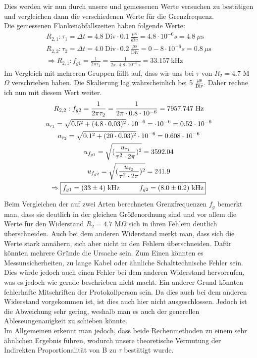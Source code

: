 Dies werden wir nun durch unsere und gemessenen Werte versuchen zu bestätigen und vergleichen dann die verschiedenen Werte für die Grenzfrequenz. \\
Die gemessenen Flankenabfallszeiten haben folgende Werte:
\begin{gather}
    R_{2,1}:\tau_1=\Delta t =4.8~\text{Div} \cdot 0.1~\frac{\mu\text{s}}{div}=4.8\cdot10^{-6}s=4.8~\mu\text{s}\\
    R_{2,2}:\tau_2=\Delta t =4.0~\text{Div} \cdot 0.2~\frac{\mu\text{s}}{\text{Div}}=0-8\cdot10^{-6}s= 0.8~\mu\text{s}\\
    \Rightarrow R_{2,1}: f_{g1}=\frac{1}{2\pi \tau_1}= \frac{1}{2\pi \cdot 4.8\cdot 10^{-6}~\text{s}}=33.157~\text{kHz}
\end{gather}
Im Vergleich mit mehreren Gruppen fällt auf, dass wir uns bei $\tau$ von $R_2=4.7$ M$\Omega$ verschrieben haben. Die Skalierung lag wahrscheinlich bei 5 $\frac{\mu\text{s}}{\text{Div}}$. Daher rechne ich nun mit diesem Wert weiter. 
\begin{gather}
    R_{2,2}: f_{g2}=\frac{1}{2\pi \tau_2}= \frac{1}{2\pi \cdot 0.8 \cdot 10^{-6}}=7957.747~\text{Hz}\\
    u_{\tau_1}=\sqrt{0.5^2+(4.8\cdot0.03)^2}\cdot10^{-6}=\cdot10^{-6}=0.52\cdot10^{-6}\\
    u_{\tau_2}=\sqrt{0.1^2+(20\cdot0.03)^2}\cdot10^{-6}=0.608\cdot10^{-6}\\
    u_{f_{g1}}=\sqrt{(\frac{u_{\tau_1}}{\tau^2 \cdot 2\pi})^2}= 3592.04\\
    u_{f_{g2}}=\sqrt{(\frac{u_{\tau_2}}{\tau^2 \cdot 2\pi})^2}= 241.9\\
    \Rightarrow\boxed{
    f_{g1}=(33\pm4)~\text{kHz} \hspace*{1cm} f_{g2}=(8.0\pm0.2)~\text{kHz}
    }
\end{gather}
Beim Vergleichen der auf zwei Arten berechneten Grenzfrequenzen $f_g$ bemerkt man, dass sie deutlich in der gleichen Größenordnung sind und vor allem die Werte für den Widerstand $R_2=4.7 $ M$\Omega$ sich in ihren Fehlern deutlich überschneiden. Auch bei dem anderen Widerstand merkt man, dass sich die Werte stark annähern, sich aber nicht in den Fehlern überschneiden. Dafür könnten mehrere Gründe die Ursache sein. Zum Einen könnten es Messunsicherheiten, zu lange Kabel oder ähnliche Schalttechnische Fehler sein. Dies würde jedoch auch einen Fehler bei dem anderen Widerstand hervorrufen, was es jedoch wie gerade beschrieben nicht macht. Ein anderer Grund könnten fehlerhafte Mitschriften der Protokollperson sein. Da dies auch bei dem anderen Widerstand vorgekommen ist, ist dies auch hier nicht ausgeschlossen. Jedoch ist die Abweichung sehr gering, weshalb man es auch der generellen Ableseungenauigkeit zu schieben könnte. \\
Im Allgemeinen erkennt man jedoch, dass beide Rechenmethoden zu einem sehr ähnlichen Ergebnis führen, wodurch unsere theoretische Vermutung der Indirekten Proportionalität von B zu $\tau$ bestätigt wurde. 
\newpage